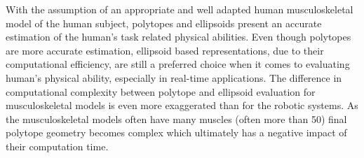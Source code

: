 With the assumption of an appropriate and well adapted human musculoskeletal model of the human subject, polytopes and ellipsoids present an accurate estimation of the human's task related physical abilities. 
Even though polytopes are more accurate estimation, ellipsoid based representations, due to their computational efficiency, are still a preferred choice when it comes to evaluating human's physical ability, especially in real-time applications. The difference in computational complexity between polytope and ellipsoid evaluation for musculoskeletal models is even more exaggerated than for the robotic systems. As the musculoskeletal models often have many muscles (often more than 50) final polytope geometry becomes complex which ultimately has a negative impact of their computation time.

